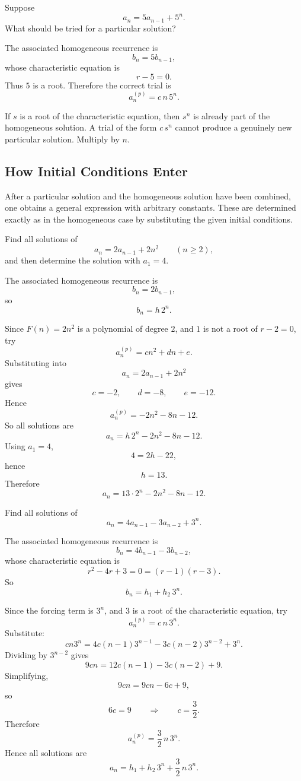 \begin{examplebox}[title={Handout question: what should we try?}]
Suppose
\[
a_n=5a_{n-1}+5^n.
\]
What should be tried for a particular solution?

The associated homogeneous recurrence is
\[
b_n=5b_{n-1},
\]
whose characteristic equation is
\[
r-5=0.
\]
Thus \(5\) is a root. Therefore the correct trial is
\[
a_n^{(p)}=c\,n\,5^n.
\]
\end{examplebox}

\begin{commonmistake}[title={Using \(c\,s^n\) when \(s\) is already a homogeneous root}]
If \(s\) is a root of the characteristic equation, then \(s^n\) is already part of the homogeneous solution. A trial of the form \(c\,s^n\) cannot produce a genuinely new particular solution. Multiply by \(n\).
\end{commonmistake}

\subsection{How Initial Conditions Enter}

After a particular solution and the homogeneous solution have been combined, one obtains a general expression with arbitrary constants. These are determined exactly as in the homogeneous case by substituting the given initial conditions.

\begin{examplebox}[title={Tutorial 6, Question 4(a)}]
Find all solutions of
\[
a_n=2a_{n-1}+2n^2
\qquad (n\ge 2),
\]
and then determine the solution with \(a_1=4\).

The associated homogeneous recurrence is
\[
b_n=2b_{n-1},
\]
so
\[
b_n=h\,2^n.
\]

Since \(F(n)=2n^2\) is a polynomial of degree \(2\), and \(1\) is not a root of \(r-2=0\), try
\[
a_n^{(p)}=cn^2+dn+e.
\]
Substituting into
\[
a_n=2a_{n-1}+2n^2
\]
gives
\[
c=-2,\qquad d=-8,\qquad e=-12.
\]
Hence
\[
a_n^{(p)}=-2n^2-8n-12.
\]
So all solutions are
\[
a_n=h\,2^n-2n^2-8n-12.
\]
Using \(a_1=4\),
\[
4=2h-22,
\]
hence
\[
h=13.
\]
Therefore
\[
\boxed{
a_n=13\cdot 2^n-2n^2-8n-12.
}
\]
\end{examplebox}

\begin{examplebox}[title={Tutorial 6, Question 5(b)}]
Find all solutions of
\[
a_n=4a_{n-1}-3a_{n-2}+3^n.
\]

The associated homogeneous recurrence is
\[
b_n=4b_{n-1}-3b_{n-2},
\]
whose characteristic equation is
\[
r^2-4r+3=0=(r-1)(r-3).
\]
So
\[
b_n=h_1+h_2\,3^n.
\]

Since the forcing term is \(3^n\), and \(3\) is a root of the characteristic equation, try
\[
a_n^{(p)}=c\,n\,3^n.
\]
Substitute:
\[
cn3^n=4c(n-1)3^{n-1}-3c(n-2)3^{n-2}+3^n.
\]
Dividing by \(3^{n-2}\) gives
\[
9cn=12c(n-1)-3c(n-2)+9.
\]
Simplifying,
\[
9cn=9cn-6c+9,
\]
so
\[
6c=9
\qquad\Longrightarrow\qquad
c=\frac32.
\]
Therefore
\[
a_n^{(p)}=\frac32\,n\,3^n.
\]
Hence all solutions are
\[
\boxed{
a_n=h_1+h_2\,3^n+\frac32\,n\,3^n.
}
\]
\end{examplebox}

